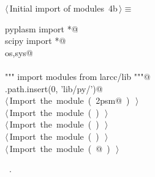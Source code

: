 \documentclass[11pt,oneside]{article}	%
\begin{document}
\begin{flushleft} \small \label{scrap12}
\protect{}$\langle\,$Initial import of modules\nobreak\ {\footnotesize 4b}$\,\rangle\equiv$
\vspace{-1ex}
\begin{list}{}{} \item
\mbox{}\verb@from pyplasm import *@\\
\mbox{}\verb@from scipy import *@\\
\mbox{}\verb@import os,sys@\\
\mbox{}\verb@@\\
\mbox{}\verb@""" import modules from larcc/lib """@\\
\mbox{}\verb@sys.path.insert(0, 'lib/py/')@\\
\mbox{}\verb@@\hbox{$\langle\,$Import the module\nobreak\ ({\footnotesize {}\label{scrap13}
 }\mbox{}\verb@lar2psm@ ) {\footnotesize {}}$\,\rangle$}\verb@@\\
\mbox{}\verb@@\hbox{$\langle\,$Import the module\nobreak\ ({\footnotesize {}\label{scrap14}
 }\mbox{}\verb@simplexn@ ) {\footnotesize {}}$\,\rangle$}\verb@@\\
\mbox{}\verb@@\hbox{$\langle\,$Import the module\nobreak\ ({\footnotesize {}\label{scrap15}
 }\mbox{}\verb@larcc@ ) {\footnotesize {}}$\,\rangle$}\verb@@\\
\mbox{}\verb@@\hbox{$\langle\,$Import the module\nobreak\ ({\footnotesize {}\label{scrap16}
 }\mbox{}\verb@largrid@ ) {\footnotesize {}}$\,\rangle$}\verb@@\\
\mbox{}\verb@@\hbox{$\langle\,$Import the module\nobreak\ ({\footnotesize {}\label{scrap17}
 }\mbox{}@ ) {\footnotesize {}}$\,\rangle$}\verb@@\\
\mbox{}\verb@@{\NWsep}
\end{list}
\vspace{-1ex}
\footnotesize\addtolength{\baselineskip}{-1ex}
\begin{list}{}{\setlength{\itemsep}{-\parsep}\setlength{\itemindent}{-\leftmargin}}
\item \NWtxtMacroRefIn\ .
\end{list}
\end{flushleft}
\end{document}
